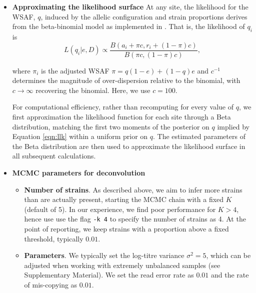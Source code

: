 \documentclass[9pt]{article}
\begin{document}
\begin{itemize}

\item {\bf Approximating the likelihood surface}
At any site, the likelihood for the WSAF, $q$, induced by the allelic configuration and strain proportions derives from the beta-binomial model as implemented in .  That is, the likelihood of $q_i$ is
\begin{equation}
L(q_{i}| e, D) \propto \frac{B(a_i + \pi c, r_i + (1-\pi) c)}{B(\pi c, (1-\pi) c)}, \label{eqn:llk}
\end{equation}

\noindent where $\pi_i$ is the adjusted WSAF $\pi = q(1-e)+(1-q)e$ and $c^{-1}$ determines the magnitude of over-dispersion relative to the binomial, with $c \to \infty$ recovering the binomial.  Here, we use $c=100$.  

For computational efficiency, rather than recomputing for every value of $q$, we first approximation the likelihood function for each site through a Beta distribution, matching the first two moments of the posterior on $q$ implied by Equation \ref{eqn:llk} within a uniform prior on $q$.  The estimated parameters of the Beta distribution are then used to approximate the likelihood surface in all subsequent calculations.  


\item {\bf MCMC parameters for deconvolution}

\begin{itemize}
\item {\bf Number of strains}. As described above, we aim to infer more strains than are actually present, starting the MCMC chain with a fixed $K$ (default of 5). In our experience, we find poor performance for $K>4$, hence use use the flag {\tt -k 4} to specify the number of strains as 4. At the point of reporting, we keep strains with a proportion above a fixed threshold, typically $0.01$.

\item {\bf Parameters}. We typically set the log-titre variance $\sigma^2 = 5$, which can be adjusted when working with extremely unbalanced samples (see \citet{Zhu2017} Supplementary Material).  We set the read error rate as $0.01$ and the rate of mis-copying as $0.01$.


\end{itemize}
\end{itemize}
\end{document}
